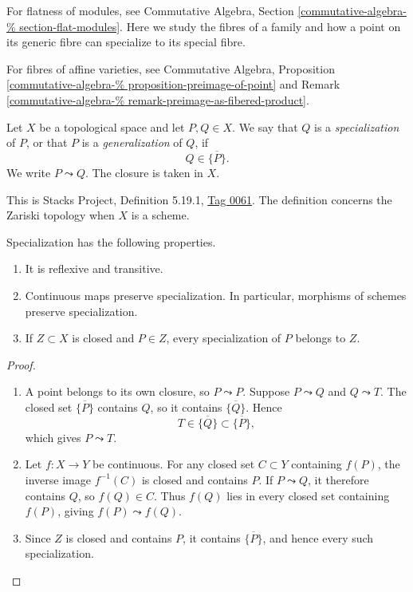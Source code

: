 \noindent
For flatness of modules, see
Commutative Algebra, Section
\ref{commutative-algebra-%
section-flat-modules}.
Here we study the fibres of a family
and how a point on its generic fibre
can specialize to its special fibre.

For fibres of affine varieties, see
Commutative Algebra, Proposition
\ref{commutative-algebra-%
proposition-preimage-of-point}
and Remark
\ref{commutative-algebra-%
remark-preimage-as-fibered-product}.

\begin{definition}
\label{definition-specialization}
Let $X$ be a topological space and let
$P,Q\in X$.
We say that $Q$ is a {\it specialization}
of $P$, or that $P$ is a
{\it generalization} of $Q$, if
$$
Q\in\overline{\{P\}}.
$$
We write $P\leadsto Q$.
The closure is taken in $X$.
\end{definition}

This is Stacks Project, Definition 5.19.1,
\href{https://stacks.math.columbia.edu/tag/%
0061}{Tag 0061}.
The definition concerns the Zariski
topology when $X$ is a scheme.

\begin{lemma}
\label{lemma-specialization-basic}
Specialization has the following
properties.
\begin{enumerate}
\item It is reflexive and transitive.
\item Continuous maps preserve
specialization. In particular, morphisms
of schemes preserve specialization.
\item If $Z\subset X$ is closed and
$P\in Z$, every specialization of $P$
belongs to $Z$.
\end{enumerate}
\end{lemma}

\begin{proof}
\begin{enumerate}
\item A point belongs to its own closure,
so $P\leadsto P$.
Suppose $P\leadsto Q$ and $Q\leadsto T$.
The closed set $\overline{\{P\}}$
contains $Q$, so it contains
$\overline{\{Q\}}$.
Hence
$$
T\in\overline{\{Q\}}
\subset\overline{\{P\}},
$$
which gives $P\leadsto T$.
\item Let $f:X\to Y$ be continuous.
For any closed set $C\subset Y$
containing $f(P)$, the inverse image
$f^{-1}(C)$ is closed and contains $P$.
If $P\leadsto Q$, it therefore contains
$Q$, so $f(Q)\in C$.
Thus $f(Q)$ lies in every closed set
containing $f(P)$, giving
$f(P)\leadsto f(Q)$.
\item Since $Z$ is closed and contains
$P$, it contains $\overline{\{P\}}$,
and hence every such specialization.
\end{enumerate}
\end{proof}

